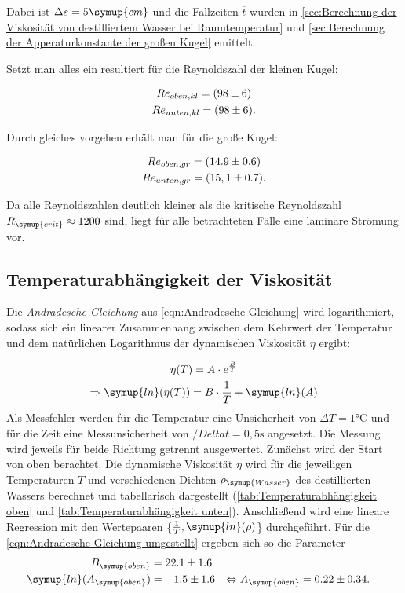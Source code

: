 Dabei ist $\Delta s=5\symup{cm}$ und die Fallzeiten $\overline{t}$ wurden in
\autoref{sec:Berechnung der Viskosität von destilliertem Wasser bei Raumtemperatur} und
\autoref{sec:Berechnung der Apperaturkonstante der großen Kugel} emittelt.

Setzt man alles ein resultiert für die Reynoldszahl der kleinen Kugel:

\begin{gather}
  Re_{oben,kl} = (98\pm6) \notag \\
  Re_{unten,kl} = (98\pm6) \notag .
\end{gather}

Durch gleiches vorgehen erhält man für die große Kugel:

\begin{gather}
  Re_{oben,gr} = (14.9\pm0.6) \notag \\
  Re_{unten,gr} = (15,1\pm0.7) \notag .
\end{gather}

Da alle Reynoldszahlen deutlich kleiner als die kritische Reynoldszahl $R_{\symup{crit}}\approx 1200$ sind, liegt für alle 
betrachteten Fälle eine laminare Strömung vor.

\subsection{Temperaturabhängigkeit der Viskosität}
\label{sec:Temperaturabhängigkeit der Viskosität}
Die \textit{Andradesche Gleichung} aus \autoref{eqn:Andradesche Gleichung} wird logarithmiert, sodass sich ein linearer Zusammenhang
zwischen dem Kehrwert der Temperatur und dem natürlichen Logarithmus der dynamischen Viskosität $\eta$ ergibt:

\begin{gather}
  \eta (T)=A\cdot e^{\frac{B}{T}} \\
  \Rightarrow \symup{ln}(\eta(T)) = B \cdot \frac{1}{T} + \symup{ln}(A) \label{eqn:Andradesche Gleichung umgestellt}
\end{gather}
Als Messfehler werden für die Temperatur eine Unsicherheit von $\Delta T = 1 \unit{\celsius}$ und für die Zeit 
eine Messunsicherheit von $/Delta t = 0,5 \unit{\second}$ angesetzt.
Die Messung wird jeweils für beide Richtung getrennt ausgewertet. Zunächst wird der Start von oben berachtet.
Die dynamische Viskosität $\eta$ wird für die jeweiligen Temperaturen $T$ und verschiedenen Dichten $\rho_{\symup{Wasser}}$ 
des destillierten Wassers berechnet und tabellarisch dargestellt (\autoref{tab:Temperaturabhängigkeit oben} 
und \autoref{tab:Temperaturabhängigkeit unten}). Anschließend wird eine lineare Regression mit den Wertepaaren 
\{$\frac{1}{T}, \symup{ln}(\rho)$\} durchgeführt. Für die \autoref{eqn:Andradesche Gleichung umgestellt} ergeben sich so die Parameter
\begin{align}
  B_{\symup{oben}}&=22.1\pm1.6 \\
  \symup{ln}(A_{\symup{oben}}) &= -1.5\pm1.6 &\Leftrightarrow A_{\symup{oben}}&=0.22\pm0.34 .
\end{align}

